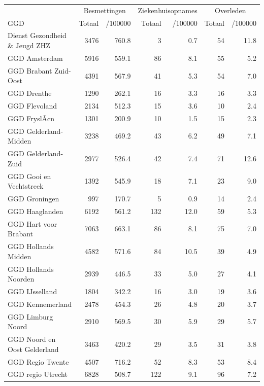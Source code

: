 \documentclass[
  english,
  man,floatsintext]{apa6}
\begin{document}
\begin{table}[H]
\centering\begingroup\fontsize{10}{12}\selectfont

\begin{threeparttable}
\begin{tabular}{lrrrrrr}
\toprule
\multicolumn{1}{c}{ } & \multicolumn{2}{c}{Besmettingen} & \multicolumn{2}{c}{Ziekenhuisopnames} & \multicolumn{2}{c}{Overleden} \\
\cmidrule(l{3pt}r{3pt}){2-3} \cmidrule(l{3pt}r{3pt}){4-5} \cmidrule(l{3pt}r{3pt}){6-7}
GGD & Totaal & /100000 & Totaal & /100000 & Totaal & /100000\\
\midrule
Dienst Gezondheid \& Jeugd ZHZ & 3476 & 760.8 & 3 & 0.7 & 54 & 11.8\\
GGD Amsterdam & 5916 & 559.1 & 86 & 8.1 & 55 & 5.2\\
GGD Brabant Zuid-Oost & 4391 & 567.9 & 41 & 5.3 & 54 & 7.0\\
GGD Drenthe & 1290 & 262.1 & 16 & 3.3 & 16 & 3.3\\
GGD Flevoland & 2134 & 512.3 & 15 & 3.6 & 10 & 2.4\\
GGD FryslÃ¢n & 1301 & 200.9 & 10 & 1.5 & 15 & 2.3\\
GGD Gelderland-Midden & 3238 & 469.2 & 43 & 6.2 & 49 & 7.1\\
GGD Gelderland-Zuid & 2977 & 526.4 & 42 & 7.4 & 71 & 12.6\\
GGD Gooi en Vechtstreek & 1392 & 545.9 & 18 & 7.1 & 23 & 9.0\\
GGD Groningen & 997 & 170.7 & 5 & 0.9 & 14 & 2.4\\
GGD Haaglanden & 6192 & 561.2 & 132 & 12.0 & 59 & 5.3\\
GGD Hart voor Brabant & 7063 & 663.1 & 86 & 8.1 & 75 & 7.0\\
GGD Hollands Midden & 4582 & 571.6 & 84 & 10.5 & 39 & 4.9\\
GGD Hollands Noorden & 2939 & 446.5 & 33 & 5.0 & 27 & 4.1\\
GGD IJsselland & 1804 & 342.2 & 16 & 3.0 & 19 & 3.6\\
GGD Kennemerland & 2478 & 454.3 & 26 & 4.8 & 20 & 3.7\\
GGD Limburg Noord & 2910 & 569.5 & 30 & 5.9 & 29 & 5.7\\
GGD Noord en Oost Gelderland & 3463 & 420.2 & 29 & 3.5 & 31 & 3.8\\
GGD Regio Twente & 4507 & 716.2 & 52 & 8.3 & 53 & 8.4\\
GGD regio Utrecht & 6828 & 508.7 & 122 & 9.1 & 96 & 7.2\\

\end{tabular}
\end{threeparttable}
\end{table}
\end{document}
